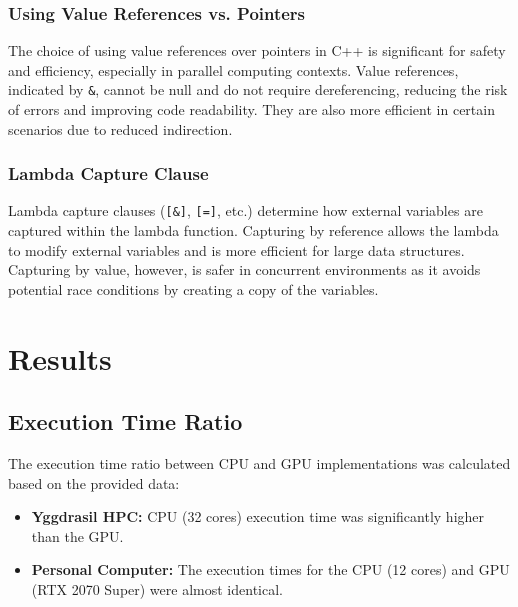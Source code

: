 \documentclass[11pt]{article}
\begin{document}
    \hypertarget{using-value-references-vs-pointers}{%
    \subsubsection{Using Value References vs. Pointers}\label{using-value-references-vs-pointers}}

    The choice of using value references over pointers in C++ is significant for safety and efficiency, especially in parallel computing contexts. Value references, indicated by \texttt{\&}, cannot be null and do not require dereferencing, reducing the risk of errors and improving code readability. They are also more efficient in certain scenarios due to reduced indirection.

    \hypertarget{lambda-capture-clause}{%
    \subsubsection{Lambda Capture Clause}\label{lambda-capture-clause}}

    Lambda capture clauses (\texttt{[\&]}, \texttt{[=]}, etc.) determine how external variables are captured within the lambda function. Capturing by reference allows the lambda to modify external variables and is more efficient for large data structures. Capturing by value, however, is safer in concurrent environments as it avoids potential race conditions by creating a copy of the variables.

    \hypertarget{results}{%
    \section{Results}\label{results}}

    \hypertarget{execution-time-ratio}{%
    \subsection{Execution Time Ratio}\label{execution-time-ratio}}

    The execution time ratio between CPU and GPU implementations was
    calculated based on the provided data:

    \begin{itemize}

    \item
      \textbf{Yggdrasil HPC:} CPU (32 cores) execution time was
      significantly higher than the GPU.
    \item
      \textbf{Personal Computer:} The execution times for the CPU (12 cores)
      and GPU (RTX 2070 Super) were almost identical.
    \end{itemize}
\end{document}
